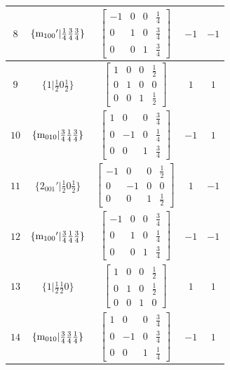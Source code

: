 \documentclass[fleqn,8pt]{jsarticle}
\begin{document}
\begin{longtable}{ccccc}
$ 8 $ & $ \{{\rm m}_{100}{}'|\frac{1}{4} \frac{3}{4} \frac{3}{4}\} $ & $ \begin{bmatrix} -1 & 0 & 0 & \frac{1}{4} \\ 0 & 1 & 0 & \frac{3}{4} \\ 0 & 0 & 1 & \frac{3}{4} \end{bmatrix} $ & $ -1 $ & $ -1 $ \\ \hline
$ 9 $ & $ \{1|\frac{1}{2} 0 \frac{1}{2}\} $ & $ \begin{bmatrix} 1 & 0 & 0 & \frac{1}{2} \\ 0 & 1 & 0 & 0 \\ 0 & 0 & 1 & \frac{1}{2} \end{bmatrix} $ & $ 1 $ & $ 1 $ \\ \hline
$ 10 $ & $ \{{\rm m}_{010}|\frac{3}{4} \frac{1}{4} \frac{3}{4}\} $ & $ \begin{bmatrix} 1 & 0 & 0 & \frac{3}{4} \\ 0 & -1 & 0 & \frac{1}{4} \\ 0 & 0 & 1 & \frac{3}{4} \end{bmatrix} $ & $ -1 $ & $ 1 $ \\ \hline
$ 11 $ & $ \{2{}_{001}{}'|\frac{1}{2} 0 \frac{1}{2}\} $ & $ \begin{bmatrix} -1 & 0 & 0 & \frac{1}{2} \\ 0 & -1 & 0 & 0 \\ 0 & 0 & 1 & \frac{1}{2} \end{bmatrix} $ & $ 1 $ & $ -1 $ \\ \hline
$ 12 $ & $ \{{\rm m}_{100}{}'|\frac{3}{4} \frac{1}{4} \frac{3}{4}\} $ & $ \begin{bmatrix} -1 & 0 & 0 & \frac{3}{4} \\ 0 & 1 & 0 & \frac{1}{4} \\ 0 & 0 & 1 & \frac{3}{4} \end{bmatrix} $ & $ -1 $ & $ -1 $ \\ \hline
$ 13 $ & $ \{1|\frac{1}{2} \frac{1}{2} 0\} $ & $ \begin{bmatrix} 1 & 0 & 0 & \frac{1}{2} \\ 0 & 1 & 0 & \frac{1}{2} \\ 0 & 0 & 1 & 0 \end{bmatrix} $ & $ 1 $ & $ 1 $ \\ \hline
$ 14 $ & $ \{{\rm m}_{010}|\frac{3}{4} \frac{3}{4} \frac{1}{4}\} $ & $ \begin{bmatrix} 1 & 0 & 0 & \frac{3}{4} \\ 0 & -1 & 0 & \frac{3}{4} \\ 0 & 0 & 1 & \frac{1}{4} \end{bmatrix} $ & $ -1 $ & $ 1 $ \\ \hline

\end{longtable}
\end{document}
